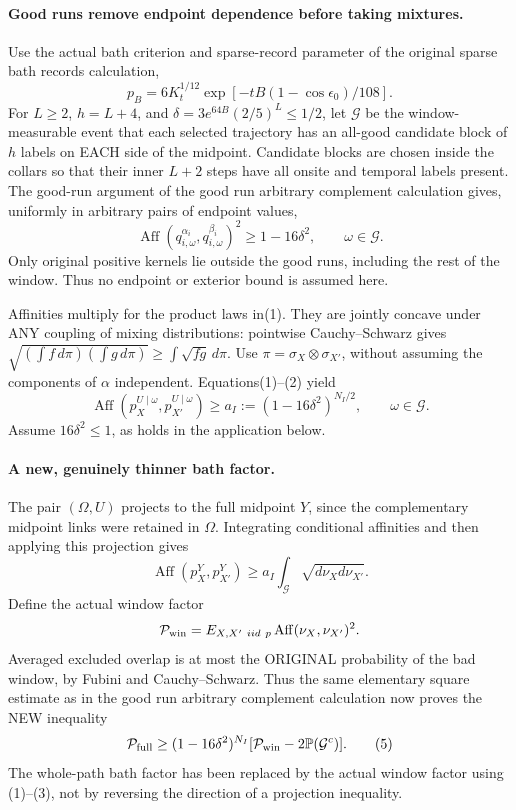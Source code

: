 \documentclass[11pt]{article}
\begin{document}
\paragraph{Good runs remove endpoint dependence before taking mixtures.}
Use the actual bath criterion and sparse-record parameter of the original sparse bath records calculation,
\[
 p_B=6K_t^{1/12}\exp[-tB(1-\cos\epsilon_0)/108].
\]
For $L\ge2$, $h=L+4$, and $\delta=3e^{64B}(2/5)^L\le1/2$, let $\mathcal G$
be the window-measurable event that each selected trajectory has an all-good
candidate block of $h$ labels on EACH side of the midpoint. Candidate blocks
are chosen inside the collars so that their inner $L+2$ steps have all onsite
and temporal labels present. The good-run argument of the good run arbitrary complement calculation gives, uniformly
in arbitrary pairs of endpoint values,
\[
 \operatorname{Aff}(q_{i,\omega}^{\alpha_i},
                    q_{i,\omega}^{\beta_i})^2\ge1-16\delta^2,
 \qquad\omega\in\mathcal G.                                            \tag{2}
\]
Only original positive kernels lie outside the good runs, including the
rest of the window. Thus no endpoint or exterior bound is assumed here.

Affinities multiply for the product laws in(1). They are jointly concave under
ANY coupling of mixing distributions: pointwise Cauchy--Schwarz gives
$\sqrt{(\int f\,d\pi)(\int g\,d\pi)}\ge\int\sqrt{fg}\,d\pi$.
Use $\pi=\sigma_X\otimes\sigma_{X'}$, without assuming the components of
$\alpha$ independent. Equations(1)--(2) yield
\[
 \operatorname{Aff}(p_X^{U\mid\omega},p_{X'}^{U\mid\omega})
       \ge a_I:=(1-16\delta^2)^{N_I/2},\qquad\omega\in\mathcal G.         \tag{3}
\]
Assume $16\delta^2\le1$, as holds in the application below.

\paragraph{A new, genuinely thinner bath factor.}
The pair $(\Omega,U)$ projects to the full midpoint $Y$, since the complementary
midpoint links were retained in $\Omega$. Integrating conditional affinities
and then applying this projection gives
\[
 \operatorname{Aff}(p_X^Y,p_{X'}^Y)
   \ge a_I\int_{\mathcal G}\sqrt{d\nu_Xd\nu_{X'}}.                       \tag{4}
\]
Define the actual window factor
\[
 \mathcal P_{\rm win}=E_{X,X'\ iid\ p}\operatorname{Aff}(\nu_X,\nu_{X'})^2.
\]
Averaged excluded overlap is at most the ORIGINAL probability of the bad window,
by Fubini and Cauchy--Schwarz. Thus the same elementary square estimate as in
the good run arbitrary complement calculation now proves the NEW inequality
\[
 \mathcal P_{\rm full}\ge(1-16\delta^2)^{N_I}
                  [\mathcal P_{\rm win}-2\mathbb P(\mathcal G^c)].       \tag{5}
\]
The whole-path bath factor has been replaced by the actual window factor using
(1)--(3), not by reversing the direction of a projection inequality.
\end{document}
